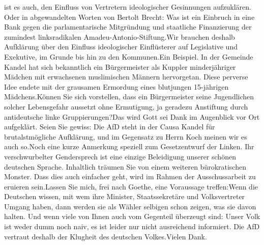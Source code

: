 \documentclass{article}
\begin{document}
ist es auch, den Einfluss von Vertretern ideologischer Gesinnungen aufzuklären. Oder in abgewandelten Worten von Bertolt Brecht: Was ist ein Einbruch in eine Bank gegen die parlamentarische Mitgründung und staatliche Finanzierung der zumindest linksradikalen Amadeu-Antonio-Stiftung.Wir brauchen deshalb Aufklärung über den Einfluss ideologischer Einflüsterer auf Legislative und Exekutive, im Grunde bis hin zu den Kommunen.Ein Beispiel. In der Gemeinde Kandel hat sich bekanntlich ein Bürgermeister als Kuppler minderjähriger Mädchen mit erwachsenen muslimischen Männern hervorgetan. Diese perverse Idee endete mit der grausamen Ermordung eines blutjungen 15-jährigen Mädchens.Können Sie sich vorstellen, dass ein Bürgermeister seine Jugendlichen solcher Lebensgefahr aussetzt ohne Ermutigung, ja geradezu Anstiftung durch antideutsche linke Gruppierungen?Das wird Gott sei Dank im Augenblick vor Ort aufgeklärt. Seien Sie gewiss: Die AfD steht in der Causa Kandel für brutalstmögliche Aufklärung, und im Gegensatz zu Herrn Koch meinen wir es auch so.Noch eine kurze Anmerkung speziell zum Gesetzentwurf der Linken. Ihr verschwurbelter Gendersprech ist eine einzige Beleidigung unserer schönen deutschen Sprache. Inhaltlich träumen Sie von einem weiteren bürokratischen Monster. Dass dies auch einfacher geht, wird im Rahmen der Ausschussarbeit zu eruieren sein.Lassen Sie mich, frei nach Goethe, eine Voraussage treffen:Wenn die Deutschen wissen, mit wem ihre Minister, Staatssekretäre und Volksvertreter Umgang haben, dann werden sie als Wähler selbigen schon zeigen, was sie davon halten. Und wenn viele von Ihnen auch vom Gegenteil überzeugt sind: Unser Volk ist weder dumm noch naiv, es ist leider nur nicht ausreichend informiert. Die AfD vertraut deshalb der Klugheit des deutschen Volkes.Vielen Dank.
\end{document}
